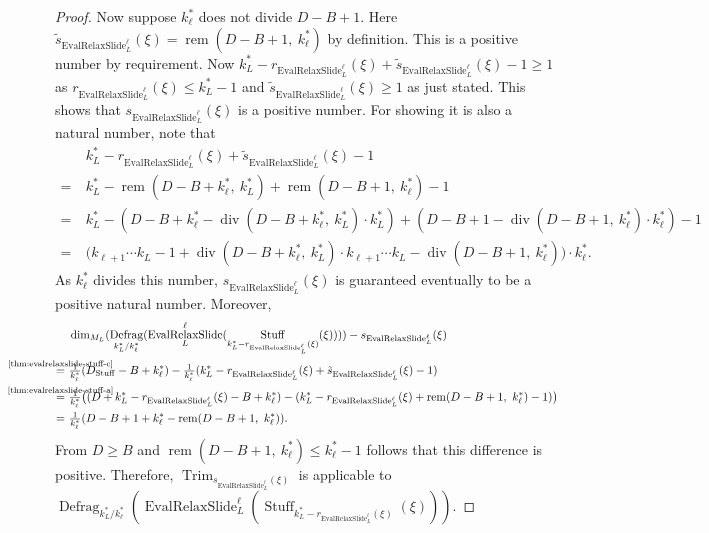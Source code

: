 \documentclass[journal]{IEEEtran}
\newcommand{\ROI}{B}
\DeclareMathOperator{\Defragmentation}{Defrag}
\DeclareMathOperator{\Stuffing}{Stuff}
\DeclareMathOperator{\Trimming}{Trim}
\renewcommand{\div}[2]{\operatorname{div}(#1,\ #2)}
\newcommand{\rem}[2]{\operatorname{rem}(#1,\ #2)}
\newcommand{\equsing}[1]{\overset{\mathclap{\text{#1}}}{=}}
\DeclareMathOperator{\EvalRelaxSlide}{EvalRelaxSlide}
\begin{document}
\begin{proof}
Now suppose $k_\ell^*$ does not divide $D - \ROI + 1$.
Here $\tilde{s}_{\EvalRelaxSlide_L^\ell}(\xi) = \rem{D - \ROI + 1}{k_\ell^*}$ by definition.
This is a positive number by requirement.
Now $k_L^* - r_{\EvalRelaxSlide_L^\ell}(\xi) + \tilde{s}_{\EvalRelaxSlide_L^\ell}(\xi) - 1 \geq 1$ as $r_{\EvalRelaxSlide_L^\ell}(\xi) \leq k_L^* - 1$ and $\tilde{s}_{\EvalRelaxSlide_L^\ell}(\xi) \geq 1$ as just stated.
This shows that $s_{\EvalRelaxSlide_L^\ell}(\xi)$ is a positive number.
For showing it is also a natural number, note that
\begin{align*}
  & k_L^* - r_{\EvalRelaxSlide_L^\ell}(\xi) + \tilde{s}_{\EvalRelaxSlide_L^\ell}(\xi) - 1\\
  =\ & k_L^* - \rem{D - \ROI + k_\ell^*}{k_L^*} + \rem{D - \ROI + 1}{k_\ell^*} - 1\\
  =\ & k_L^* - (D - \ROI + k_\ell^* - \div{D - \ROI + k_\ell^*}{k_L^*}\cdot k_L^*) + (D - \ROI + 1 - \div{D - \ROI + 1}{k_\ell^*}\cdot k_\ell^*) - 1\\
  =\ & \big(k_{\ell + 1}\cdots k_L - 1 + \div{D - \ROI + k_\ell^*}{k_L^*}\cdot k_{\ell + 1}\cdots k_L - \div{D - \ROI + 1}{k_\ell^*} \big)\cdot k_\ell^*\text{.}
\end{align*}
As $k_\ell^*$ divides this number, $s_{\EvalRelaxSlide_L^\ell}(\xi)$ is guaranteed eventually to be a positive natural number.
Moreover,
\begin{align*}
  & \dim_{M_L}( \Defragmentation_{k_L^* / k_\ell^*}( \EvalRelaxSlide_L^\ell( \Stuffing_{k_L^* - r_{\EvalRelaxSlide_L^\ell}(\xi)}(\xi) ) ) ) - s_{\EvalRelaxSlide_L^\ell}(\xi)\\
  \equsing{\ref{thm:evalrelaxslide-stuff-c}}\ & \tfrac{1}{k_\ell^*}(D_{\Stuffing} - \ROI + k_\ell^*) - \tfrac{1}{k_\ell^*} (k_L^* - r_{\EvalRelaxSlide_L^\ell}(\xi) + \tilde{s}_{\EvalRelaxSlide_L^\ell}(\xi) - 1)\\
  \equsing{\ref{thm:evalrelaxslide-stuff-a}}\ & \tfrac{1}{k_\ell^*}\big( (D + k_L^* - r_{\EvalRelaxSlide_L^\ell}(\xi) - \ROI + k_\ell^*) - (k_L^* - r_{\EvalRelaxSlide_L^\ell}(\xi) + \rem{D - \ROI + 1}{k_\ell^*} - 1) \big)\\
  =\ & \tfrac{1}{k_\ell^*}(D - \ROI + 1 + k_\ell^* - \rem{D - \ROI + 1}{k_\ell^*})\text{.}
\end{align*}
From $D \geq \ROI$ and $\rem{D - \ROI + 1}{k_\ell^*} \leq k_\ell^* - 1$ follows that this difference is positive.
Therefore, $\Trimming_{s_{\EvalRelaxSlide_L^\ell}(\xi)}$ is applicable to $\Defragmentation_{k_L^* / k_\ell^*}( \EvalRelaxSlide_L^\ell( \Stuffing_{k_L^* - r_{\EvalRelaxSlide_L^\ell}(\xi)}(\xi) ) )$.

\end{proof}
\end{document}
